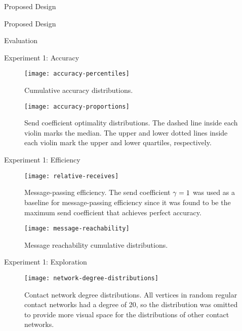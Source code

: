 \documentclass[12pt]{beamer}
\begin{document}
\begin{section}{Proposed Design}

\begin{frame}{Proposed Design}
  
\end{frame}

\end{section}

\begin{section}{Evaluation}

\begin{frame}[allowframebreaks]{Experiment 1: Accuracy}
  \begin{figure}
    \centering
    \texttt{[image: accuracy-percentiles]}
    \caption[Cumulative accuracy distributions]{Cumulative accuracy distributions.}
  \end{figure}

  \begin{figure}
    \centering
    \texttt{[image: accuracy-proportions]}
    \caption[Send coefficient optimality distributions]{Send coefficient optimality distributions. The dashed line inside each violin marks the median. The upper and lower dotted lines inside each violin mark the upper and lower quartiles, respectively.}
  \end{figure}
\end{frame}

\begin{frame}[allowframebreaks]{Experiment 1: Efficiency}
  \begin{figure}
    \centering
    \texttt{[image: relative-receives]}
    \caption[Message-passing efficiency]{Message-passing efficiency. The send coefficient $\gamma = 1$ was used as a baseline for message-passing efficiency since it was found to be the maximum send coefficient that achieves perfect accuracy.}
  \end{figure}

  \begin{figure}
    \centering
    \texttt{[image: message-reachability]}
    \caption[Message reachability cumulative distributions]{Message reachability cumulative distributions.}
  \end{figure}
\end{frame}

\begin{frame}[allowframebreaks]{Experiment 1: Exploration}
  \begin{figure}
    \centering
    \texttt{[image: network-degree-distributions]}
    \caption[Contact network degree distributions]{Contact network degree distributions. All vertices in random regular contact networks had a degree of 20, so the distribution was omitted to provide more visual space for the distributions of other contact networks.}
  \end{figure}
  

\end{frame}
\end{section}
\end{document}
